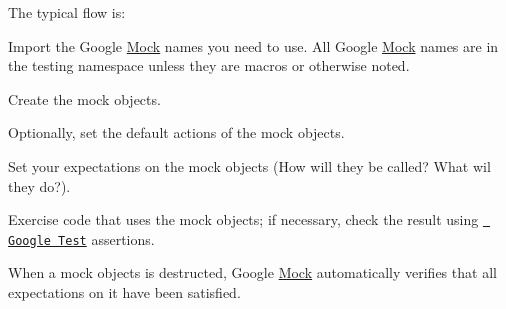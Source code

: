 The typical flow is\+:
\begin{DoxyEnumerate}
\item Import the Google \mbox{\hyperlink{class_mock}{Mock}} names you need to use. All Google \mbox{\hyperlink{class_mock}{Mock}} names are in the {\ttfamily testing} namespace unless they are macros or otherwise noted.
\end{DoxyEnumerate}
\begin{DoxyEnumerate}
\item Create the mock objects.
\end{DoxyEnumerate}
\begin{DoxyEnumerate}
\item Optionally, set the default actions of the mock objects.
\end{DoxyEnumerate}
\begin{DoxyEnumerate}
\item Set your expectations on the mock objects (How will they be called? What wil they do?).
\end{DoxyEnumerate}
\begin{DoxyEnumerate}
\item Exercise code that uses the mock objects; if necessary, check the result using \href{../../googletest/}{\texttt{ Google Test}} assertions.
\end{DoxyEnumerate}
\begin{DoxyEnumerate}
\item When a mock objects is destructed, Google \mbox{\hyperlink{class_mock}{Mock}} automatically verifies that all expectations on it have been satisfied.
\end{DoxyEnumerate}

